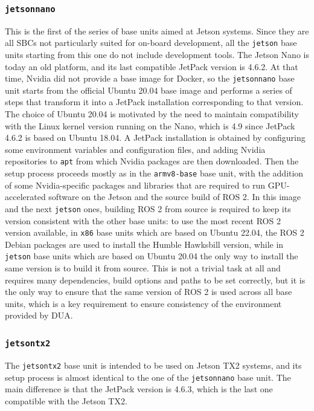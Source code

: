 \subsubsection{\texttt{jetsonnano}}
\label{sec:dua_base_units_jetsonnano}
This is the first of the series of base units aimed at Jetson systems. Since they are all SBCs not particularly suited for on-board development, all the \texttt{jetson} base units starting from this one do not include development tools. The Jetson Nano is today an old platform, and its last compatible JetPack version is 4.6.2. At that time, Nvidia did not provide a base image for Docker, so the \texttt{jetsonnano} base unit starts from the official Ubuntu 20.04 base image and performs a series of steps that transform it into a JetPack installation corresponding to that version. The choice of Ubuntu 20.04 is motivated by the need to maintain compatibility with the Linux kernel version running on the Nano, which is 4.9 since JetPack 4.6.2 is based on Ubuntu 18.04. A JetPack installation is obtained by configuring some environment variables and configuration files, and adding Nvidia repositories to \texttt{apt} from which Nvidia packages are then downloaded. Then the setup process proceeds mostly as in the \texttt{armv8-base} base unit, with the addition of some Nvidia-specific packages and libraries that are required to run GPU-accelerated software on the Jetson and the source build of ROS 2. In this image and the next \texttt{jetson} ones, building ROS 2 from source is required to keep its version consistent with the other base units: to use the most recent ROS 2 version available, in \texttt{x86} base units which are based on Ubuntu 22.04, the ROS 2 Debian packages are used to install the Humble Hawksbill version, while in \texttt{jetson} base units which are based on Ubuntu 20.04 the only way to install the same version is to build it from source. This is not a trivial task at all and requires many dependencies, build options and paths to be set correctly, but it is the only way to ensure that the same version of ROS 2 is used across all base units, which is a key requirement to ensure consistency of the environment provided by DUA.

\subsubsection{\texttt{jetsontx2}}
\label{sec:dua_base_units_jetsontx2}
The \texttt{jetsontx2} base unit is intended to be used on Jetson TX2 systems, and its setup process is almost identical to the one of the \texttt{jetsonnano} base unit. The main difference is that the JetPack version is 4.6.3, which is the last one compatible with the Jetson TX2.

